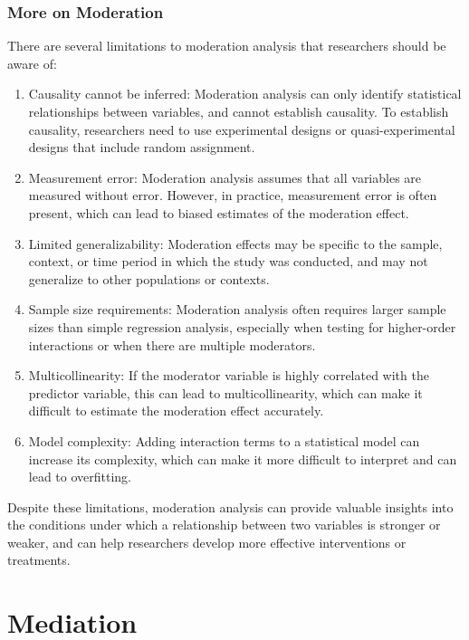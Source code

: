 \documentclass[
]{ctexart}
\begin{document}
\hypertarget{more-on-moderation}{%
\subsubsection{More on Moderation}\label{more-on-moderation}}

There are several limitations to moderation analysis that researchers
should be aware of:

\begin{enumerate}
\def\labelenumi{\arabic{enumi}.}
\item
  Causality cannot be inferred: Moderation analysis can only identify
  statistical relationships between variables, and cannot establish
  causality. To establish causality, researchers need to use
  experimental designs or quasi-experimental designs that include random
  assignment.
\item
  Measurement error: Moderation analysis assumes that all variables are
  measured without error. However, in practice, measurement error is
  often present, which can lead to biased estimates of the moderation
  effect.
\item
  Limited generalizability: Moderation effects may be specific to the
  sample, context, or time period in which the study was conducted, and
  may not generalize to other populations or contexts.
\item
  Sample size requirements: Moderation analysis often requires larger
  sample sizes than simple regression analysis, especially when testing
  for higher-order interactions or when there are multiple moderators.
\item
  Multicollinearity: If the moderator variable is highly correlated with
  the predictor variable, this can lead to multicollinearity, which can
  make it difficult to estimate the moderation effect accurately.
\item
  Model complexity: Adding interaction terms to a statistical model can
  increase its complexity, which can make it more difficult to interpret
  and can lead to overfitting.
\end{enumerate}

Despite these limitations, moderation analysis can provide valuable
insights into the conditions under which a relationship between two
variables is stronger or weaker, and can help researchers develop more
effective interventions or treatments.

\hypertarget{mediation}{%
\section{Mediation}\label{mediation}}
\end{document}
